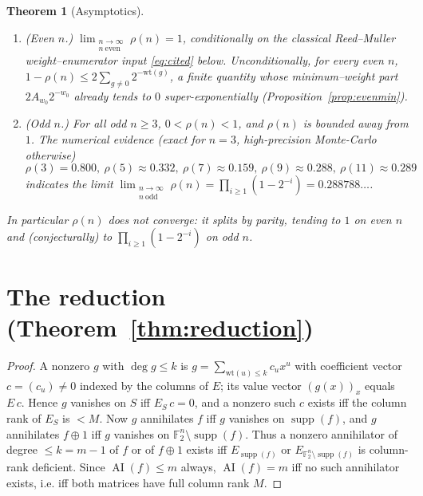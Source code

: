 \documentclass{amsart}
\newtheorem{theorem}{Theorem}
\theoremstyle{definition}
\DeclareMathOperator{\AI}{AI}
\DeclareMathOperator{\supp}{supp}
\newcommand{\F}{\mathbb{F}}
\begin{document}
\begin{theorem}[Asymptotics]\label{thm:asy}
\begin{enumerate}
\item (Even $n$.) $\displaystyle\lim_{\substack{n\to\infty\\ n\
      \mathrm{even}}}\rho(n)=1$, conditionally on the classical
      Reed--Muller weight--enumerator input \eqref{eq:cited} below.
      Unconditionally, for every even $n$,
      $1-\rho(n)\le 2\sum_{g\ne0}2^{-\mathrm{wt}(g)}$, a finite quantity
      whose minimum--weight part $2A_{w_0}2^{-w_0}$ already tends to $0$
      super-exponentially (Proposition~\ref{prop:evenmin}).
\item (Odd $n$.) For all odd $n\ge3$, $0<\rho(n)<1$, and $\rho(n)$ is
      bounded away from $1$. The numerical evidence (exact for $n=3$,
      high-precision Monte-Carlo otherwise)
      \[
      \rho(3)=0.800,\ \rho(5)\approx0.332,\ \rho(7)\approx0.159,\
      \rho(9)\approx0.288,\ \rho(11)\approx0.289
      \]
      indicates the limit
      $\displaystyle\lim_{\substack{n\to\infty\\ n\
      \mathrm{odd}}}\rho(n)=\prod_{i\ge1}(1-2^{-i})=0.288788\ldots$.
\end{enumerate}
In particular $\rho(n)$ does not converge: it splits by parity, tending to
$1$ on even $n$ and (conjecturally) to $\prod_{i\ge1}(1-2^{-i})$ on odd
$n$.
\end{theorem}

\section{The reduction (Theorem~\ref{thm:reduction})}

\begin{proof}
A nonzero $g$ with $\deg g\le k$ is $g=\sum_{\mathrm{wt}(u)\le k}c_ux^u$
with coefficient vector $c=(c_u)\ne0$ indexed by the columns of $E$; its
value vector $(g(x))_x$ equals $E\,c$. Hence $g$ vanishes on $S$ iff
$E_S\,c=0$, and a nonzero such $c$ exists iff the column rank of $E_S$ is
$<M$. Now $g$ annihilates $f$ iff $g$ vanishes on $\supp(f)$, and $g$
annihilates $f\oplus1$ iff $g$ vanishes on $\F_2^n\setminus\supp(f)$. Thus
a nonzero annihilator of degree $\le k=m-1$ of $f$ or of $f\oplus1$ exists
iff $E_{\supp(f)}$ or $E_{\F_2^n\setminus\supp(f)}$ is column-rank
deficient. Since $\AI(f)\le m$ always, $\AI(f)=m$ iff no such annihilator
exists, i.e. iff both matrices have full column rank $M$.
\end{proof}
\end{document}

